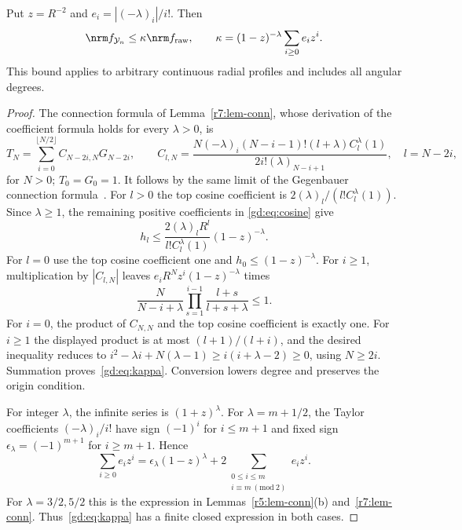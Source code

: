\begin{lemma}\label{gd:lem:connection}
Put $z=R^{-2}$ and $e_i=|(-\lambda)_i|/i!$. Then
\begin{equation}\label{gd:eq:kappa}
 \nrm f_{\mathcal Y_n}\le\kappa\nrm f_{\rm raw},\qquad
 \kappa=(1-z)^{-\lambda}\sum_{i\ge0}e_i z^i .
\end{equation}
This bound applies to arbitrary continuous radial profiles and includes
all angular degrees.
\end{lemma}
\begin{proof}
The connection formula of Lemma~\ref{r7:lem-conn}, whose derivation of
the coefficient formula holds for every $\lambda>0$, is
\begin{equation}\label{gd:eq:connection}
 T_N=\sum_{i=0}^{\lfloor N/2\rfloor} C_{N-2i,N}G_{N-2i},\qquad
 C_{l,N}=
 \frac{N(-\lambda)_i(N-i-1)!(l+\lambda)C_l^\lambda(1)}
 {2i!(\lambda)_{N-i+1}},
 \quad l=N-2i,
\end{equation}
for $N>0$; $T_0=G_0=1$. It follows by the same limit of the
Gegenbauer connection formula~\cite[18.18.16,18.7.25]{DLMF}.
For $l>0$ the top cosine coefficient is
$2(\lambda)_l/(l!C_l^\lambda(1))$.
Since $\lambda\ge1$, the remaining positive coefficients in
\eqref{gd:eq:cosine} give
\[
 h_l\le
 \frac{2(\lambda)_lR^l}{l!C_l^\lambda(1)}(1-z)^{-\lambda}.
\]
For $l=0$ use the top cosine coefficient one and
$h_0\le(1-z)^{-\lambda}$.
For $i\ge1$, multiplication by $|C_{l,N}|$ leaves
$e_iR^Nz^i(1-z)^{-\lambda}$ times
\[
 \frac{N}{N-i+\lambda}
 \prod_{s=1}^{i-1}\frac{l+s}{l+s+\lambda}\le1.
\]
For $i=0$, the product of $C_{N,N}$ and the top cosine
coefficient is exactly one. For $i\ge1$ the displayed product is at most
$(l+1)/(l+i)$, and the desired inequality reduces to
$i^2-\lambda i+N(\lambda-1)\ge i(i+\lambda-2)\ge0$,
using $N\ge2i$. Summation proves~\eqref{gd:eq:kappa}.
Conversion lowers degree and preserves the origin condition.

For integer $\lambda$, the infinite series is $(1+z)^\lambda$.
For $\lambda=m+1/2$, the Taylor coefficients $(-\lambda)_i/i!$
have sign $(-1)^i$ for $i\le m+1$ and fixed sign
$\epsilon_\lambda=(-1)^{m+1}$ for $i\ge m+1$. Hence
\[
 \sum_{i\ge0}e_i z^i=\epsilon_\lambda(1-z)^\lambda
 +2\sum_{\substack{0\le i\le m\\i\equiv m\ (\mathrm{mod}\ 2)}}e_i z^i.
\]
For $\lambda=3/2,5/2$ this is the expression in
Lemmas~\ref{r5:lem-conn}(b) and~\ref{r7:lem-conn}.
Thus~\eqref{gd:eq:kappa} has a finite closed expression in both cases.
\end{proof}

